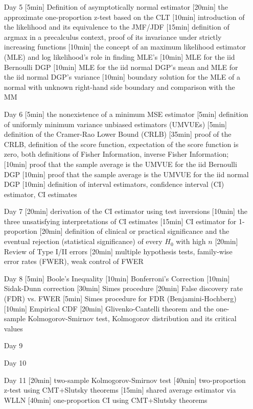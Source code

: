 \begin{enumerate}
\item[Day 5] [5min] Definition of asymptotically normal estimator  [20min] the approximate one-proportion z-test based on the CLT [10min] introduction of the likelihood and its equivalence to the JMF/JDF [15min] definition of argmax in a precalculus context, proof of its invariance under strictly increasing functions [10min] the concept of an maximum likelihood estimator (MLE) and log likelihood's role in finding MLE's [10min] MLE for the iid Bernoulli DGP [10min] MLE for the iid normal DGP's mean and MLE for the iid normal DGP's variance [10min] boundary solution for the MLE of a normal with unknown right-hand side boundary and comparison with the MM

\item[Day 6] [5min] the nonexistence of a minimum MSE estimator [5min] definition of uniformly minimum variance unbiased estimators (UMVUEs)  [5min] definition of the Cramer-Rao Lower Bound (CRLB) [35min] proof of the CRLB, definition of the score function, expectation of the score function is zero, both definitions of Fisher Information, inverse Fisher Information; [10min] proof that the sample average is the UMVUE for the iid Bernoulli DGP [10min] proof that the sample average is the UMVUE for the iid normal DGP [10min] definition of interval estimators, confidence interval (CI) estimator, CI estimates

\item[Day 7] [20min] derivation of the CI estimator using test inversions [10min] the three unsatisfying interpretations of CI estimates [15min] CI estimator for 1-proportion [20min] definition of clinical or practical significance and the eventual rejection (statistical significance) of every $H_0$ with high $n$ [20min] Review of Type I/II errors [20min] multiple hypothesis tests, family-wise error rates (FWER), weak control of FWER

\item[Day 8] [5min] Boole's Inequality [10min] Bonferroni's Correction [10min] Sidak-Dunn correction [30min] Simes procedure [20min] False discovery rate (FDR) vs. FWER [5min] Simes procedure for FDR (Benjamini-Hochberg) [10min] Empirical CDF [20min] Glivenko-Cantelli theorem and the one-sample Kolmogorov-Smirnov test, Kolmogorov distribution and its critical values


\item[Day 9] 
\item[Day 10] 

\item[Day 11] [20min] two-sample Kolmogorov-Smirnov test [40min] two-proportion z-test using CMT+Slutsky theorems [15min] shared average estimator via WLLN [40min] one-proportion CI using CMT+Slutsky theorems


\end{enumerate}

